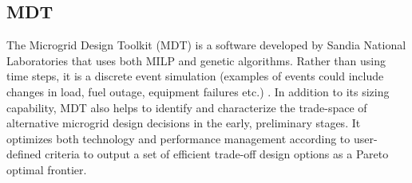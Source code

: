 \documentclass[final,3p,times]{elsarticle}
\begin{document}
\subsection{MDT}

The Microgrid Design Toolkit (MDT) is a software developed by Sandia National Laboratories that uses both MILP and genetic algorithms. Rather than using time steps, it is a discrete event simulation (examples of events could include changes in load, fuel outage, equipment failures etc.) \cite{tools_summary}. In addition to its sizing capability, MDT also helps to identify and characterize the trade-space of alternative microgrid design decisions in the early, preliminary stages. It optimizes both technology and performance management according to user-defined criteria to output a set of efficient trade-off design options as a Pareto optimal frontier.

\end{document}
